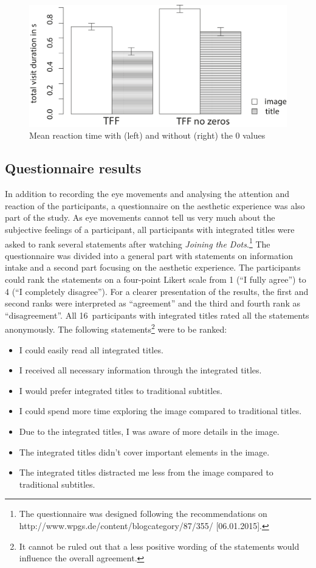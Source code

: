 \documentclass[output=paper]{langsci/langscibook}
\begin{document}
  
\begin{figure} 
  \includegraphics[height=.3\textheight]{figures/Fox10.pdf}
  \caption{Mean reaction time with (left) and without (right) the 0 values}
  \label{fox:fig:10}
\end{figure}
 

\subsection{Questionnaire results}

In addition to recording the eye movements and analysing the attention and reaction of the participants, a questionnaire on the aesthetic experience was also part of the study. As eye movements cannot tell us very much about the subjective feelings of a participant, all participants with integrated titles were asked to rank several statements after watching \textit{Joining the Dots}.\footnote{The questionnaire was designed following the recommendations on http://www.wpgs.de/content/blogcategory/87/355/ [06.01.2015].} The questionnaire was divided into a general part with statements on information intake and a second part focusing on the aesthetic experience. The participants could rank the statements on a four-point Likert scale from 1 (``I fully agree'') to 4 (``I completely disagree''). For a clearer presentation of the results, the first and second ranks were interpreted as ``agreement'' and the third and fourth rank as ``disagreement''. All 16~participants with integrated titles rated all the statements anonymously. The following statements\footnote{It cannot be ruled out that a less positive wording of the statements would influence the overall agreement.} were to be ranked:

\begin{itemize}
\item I could easily read all integrated titles.
\item I received all necessary information through the integrated titles.
\item I would prefer integrated titles to traditional subtitles.
\item I could spend more time exploring the image compared to traditional titles.
\item Due to the integrated titles, I was aware of more details in the image.
\item The integrated titles didn't cover important elements in the image.
\item The integrated titles distracted me less from the image compared to traditional subtitles.
\end{itemize}
\end{document}

